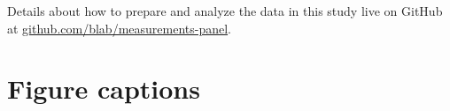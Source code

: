 \documentclass[utf8]{FrontiersinHarvard} %
\begin{document}
Details about how to prepare and analyze the data in this study live on GitHub at \href{https://github.com/blab/measurements-panel/}{github.com/blab/measurements-panel}.





\section*{Figure captions}

\end{document}
